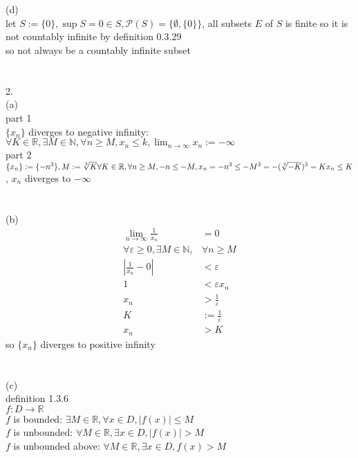 \documentclass[12pt, border = 4pt, multi]{article} %
\begin{document}
\\
\\
(d)\\
let $S := \{0\}, \sup S = 0 \in S, \mathcal{P}(S) = \{\emptyset, \{0\}\}$, all subsets $E$ of $S$ is finite so it is not countably infinite by definition 0.3.29\\
so not always be a countably infinite subset\\
\\
\\
2.\\
(a)\\
part 1\\
$\{x_n\}$ diverges to negative infinity: $\forall K \in \mathbb{R}, \exists M \in \mathbb{N}, \forall n \geq M, x_n \leq k, \lim_{n \rightarrow \infty} x_n := -\infty$\\
part 2\\
$\{x_n\} := \{-n ^ 3\}, M := \sqrt[3]{K}\\
\forall K \in \mathbb{R}, \forall n \geq M, -n \leq -M, x_n = -n ^ 3 \leq -M ^ 3 = -(\sqrt[3]{-K}) ^ 3 = K\\
x_n \leq K$, $x_n$ diverges to $-\infty$\\
\\
\\
(b)\\
\begin{align*}
\lim_{n \rightarrow \infty} \frac{1}{x_n} &= 0\\
\forall \varepsilon \geq 0, \exists M \in \mathbb{N}, &\forall n \geq M\\
\left|\frac{1}{x_n} - 0\right| &< \varepsilon\\
1 &< \varepsilon x_n\\
x_n &> \frac{1}{\varepsilon}\\
K &:= \frac{1}{\varepsilon}\\
x_n &> K
\end{align*}
so $\{x_n\}$ diverges to positive infinity\\
\\
\\
(c)\\
definition 1.3.6\\
$f: D \rightarrow \mathbb{R}$\\
$f$ is bounded: $\exists M \in \mathbb{R}, \forall x \in D, |f(x)| \leq M$\\
$f$ is unbounded: $\forall M \in \mathbb{R}, \exists x \in D, |f(x)| > M$\\
$f$ is unbounded above: $\forall M \in \mathbb{R}, \exists x \in D, f(x) > M$\\
\end{document}
